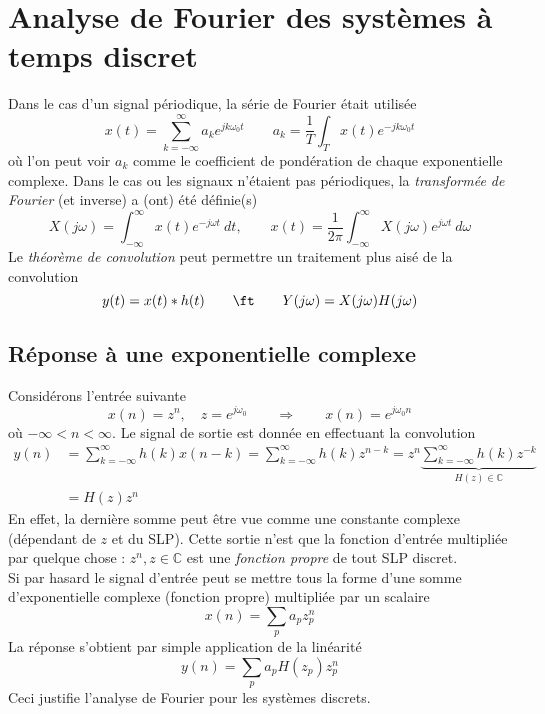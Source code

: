 \chapter{Analyse de Fourier des systèmes à temps discret}
Dans le cas d'un signal périodique, la série de Fourier était utilisée
\begin{equation}
x(t) = \sum_{k=-\infty}^\infty a_ke^{jk\omega_0t}\qquad a_k = \frac{1}{T}\int_T
x(t)e^{-jk\omega_0t}
\end{equation}
où l'on peut voir $a_k$ comme le coefficient de pondération de chaque exponentielle 
complexe. Dans le cas ou les signaux n'étaient pas périodiques, la \textit{transformée 
de Fourier} (et inverse) a (ont) été définie(s)
\begin{equation}
X(j\omega) = \int_{-\infty}^\infty x(t)e^{-j\omega t}\ dt,\qquad x(t)=\frac{1}{2\pi}
\int_{-\infty}^\infty X(j\omega)e^{j\omega t}\ d\omega
\end{equation}
Le \textit{théorème de convolution} peut permettre un traitement plus aisé de la 
convolution
\begin{equation}
y(t) = x(t)*h(t)\qquad \ft\qquad Y(j\omega) = X(j\omega)H(j\omega)
\end{equation}

\section{Réponse à une exponentielle complexe}
Considérons l'entrée suivante
\begin{equation}
x(n) = z^n,\quad z=e^{j\omega_0}\qquad\Rightarrow\qquad x(n) = e^{j\omega_0n}
\end{equation}
où $-\infty<n<\infty$. Le signal de sortie est donnée en effectuant la convolution
\begin{equation}
\begin{array}{ll}
y(n) &= \sum_{k=-\infty}^\infty h(k)x(n-k) = \sum_{k=-\infty}^\infty h(k)z^{n-k} = z^n 
\underbrace{\sum_{k=-\infty}^\infty h(k)z^{-k}}_{H(z) \in \mathbb{C}}\\
&= H(z)z^n
\end{array}
\end{equation}
En effet, la dernière somme peut être vue comme une constante complexe (dépendant de $z$ 
et du SLP). Cette sortie  n'est que la fonction d'entrée multipliée par quelque chose : 
$z^n,z\in\mathbb{C}$ est une \textit{fonction propre} de tout SLP discret.\\
Si par hasard le signal d'entrée peut se mettre tous la forme d'une somme d'exponentielle 
complexe (fonction propre) multipliée par un scalaire
\begin{equation}
x(n) = \sum_p a_pz_p^n
\end{equation}
La réponse s'obtient par simple application de la linéarité
\begin{equation}
y(n) = \sum_p a_pH(z_p)z_p^n
\end{equation}
Ceci justifie l'analyse de Fourier pour les systèmes discrets.

